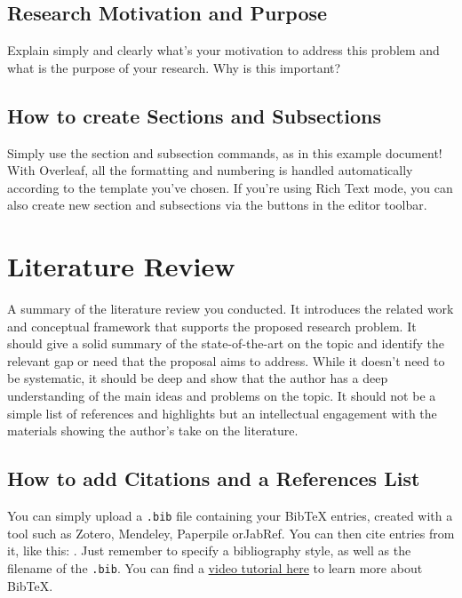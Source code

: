 \documentclass{article}
\begin{document}
\subsection{Research Motivation and Purpose}

Explain simply and clearly what's your motivation to address this problem and what is the purpose of your research. Why is this important?

\subsection{How to create Sections and Subsections}

Simply use the section and subsection commands, as in this example document! With Overleaf, all the formatting and numbering is handled automatically according to the template you've chosen. If you're using Rich Text mode, you can also create new section and subsections via the buttons in the editor toolbar.

\section{Literature Review}
A summary of the literature review you conducted. It introduces the related work and conceptual framework that supports the proposed research problem.
It should give a solid summary of the state-of-the-art on the topic and identify the relevant gap or need that the proposal aims to address.
While it doesn’t need to be systematic, it should be deep and show that the author has a deep understanding of the main ideas and problems on the topic. It should not be a simple list of references and highlights but an intellectual engagement with the materials showing the author’s take on the literature.

\subsection{How to add Citations and a References List}

You can simply upload a \verb|.bib| file containing your BibTeX entries, created with a tool such as Zotero, Mendeley, Paperpile orJabRef. You can then cite entries from it, like this: \cite{viNotJustSeeing2017}. Just remember to specify a bibliography style, as well as the filename of the \verb|.bib|. You can find a \href{https://www.overleaf.com/help/97-how-to-include-a-bibliography-using-bibtex}{video tutorial here} to learn more about BibTeX.
\end{document}
